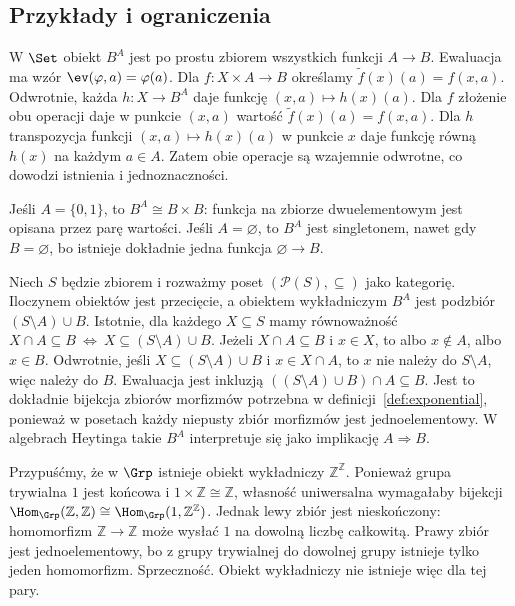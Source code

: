 \subsection{Przykłady i ograniczenia}
\begin{przyklad}\label{przyklad:exponential-set}
W $\Set$ obiekt $B^A$ jest po prostu zbiorem wszystkich funkcji $A\to B$. Ewaluacja ma wzór $\ev(\varphi,a)=\varphi(a)$. Dla $f:X\times A\to B$ określamy $\widetilde f(x)(a)=f(x,a)$. Odwrotnie, każda $h:X\to B^A$ daje funkcję $(x,a)\mapsto h(x)(a)$. Dla $f$ złożenie obu operacji daje w punkcie $(x,a)$ wartość $\widetilde f(x)(a)=f(x,a)$. Dla $h$ transpozycja funkcji $(x,a)\mapsto h(x)(a)$ w punkcie $x$ daje funkcję równą $h(x)$ na każdym $a\in A$. Zatem obie operacje są wzajemnie odwrotne, co dowodzi istnienia i jednoznaczności.

Jeśli $A=\{0,1\}$, to $B^A\cong B\times B$: funkcja na zbiorze dwuelementowym jest opisana przez parę wartości. Jeśli $A=\varnothing$, to $B^A$ jest singletonem, nawet gdy $B=\varnothing$, bo istnieje dokładnie jedna funkcja $\varnothing\to B$.
\end{przyklad}

\begin{przyklad}
Niech $S$ będzie zbiorem i rozważmy poset $(\mathcal P(S),\subseteq)$ jako kategorię. Iloczynem obiektów jest przecięcie, a obiektem wykładniczym $B^A$ jest podzbiór $(S\setminus A)\cup B$. Istotnie, dla każdego $X\subseteq S$ mamy równoważność
$X\cap A\subseteq B\ \Longleftrightarrow\ X\subseteq(S\setminus A)\cup B$.
Jeżeli $X\cap A\subseteq B$ i $x\in X$, to albo $x\notin A$, albo $x\in B$. Odwrotnie, jeśli $X\subseteq(S\setminus A)\cup B$ i $x\in X\cap A$, to $x$ nie należy do $S\setminus A$, więc należy do $B$. Ewaluacja jest inkluzją $((S\setminus A)\cup B)\cap A\subseteq B$. Jest to dokładnie bijekcja zbiorów morfizmów potrzebna w definicji~\ref{def:exponential}, ponieważ w posetach każdy niepusty zbiór morfizmów jest jednoelementowy. W algebrach Heytinga takie $B^A$ interpretuje się jako implikację $A\Rightarrow B$.
\end{przyklad}

\begin{przyklad}
Przypuśćmy, że w $\Grp$ istnieje obiekt wykładniczy $\mathbb Z^{\mathbb Z}$. Ponieważ grupa trywialna $1$ jest końcowa i $1\times\mathbb Z\cong\mathbb Z$, własność uniwersalna wymagałaby bijekcji
$\Hom_{\Grp}(\mathbb Z,\mathbb Z)\cong\Hom_{\Grp}(1,\mathbb Z^{\mathbb Z})$.
Jednak lewy zbiór jest nieskończony: homomorfizm $\mathbb Z\to\mathbb Z$ może wysłać $1$ na dowolną liczbę całkowitą. Prawy zbiór jest jednoelementowy, bo z grupy trywialnej do dowolnej grupy istnieje tylko jeden homomorfizm. Sprzeczność. Obiekt wykładniczy nie istnieje więc dla tej pary.
\end{przyklad}

